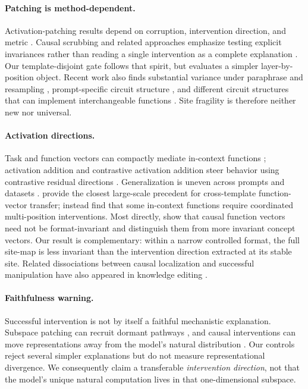 \documentclass[10pt]{article}
\begin{document}
\paragraph{Patching is method-dependent.}
Activation-patching results depend on corruption, intervention direction, and
metric \citep{heimersheim2024patching,zhang2024bestpractices}. Causal scrubbing
and related approaches emphasize testing explicit invariances rather than
reading a single intervention as a complete explanation
\citep{chan2022causal,long2025triangulation}. Our template-disjoint gate follows
that spirit, but evaluates a simpler layer-by-position object. Recent work also
finds substantial variance under paraphrase and resampling
\citep{meloux2025variance}, prompt-specific circuit structure
\citep{franco2026prompt}, and different circuit structures that can implement
interchangeable functions \citep{bayatmakou2026many}. Site fragility is
therefore neither new nor universal.

\paragraph{Activation directions.}
Task and function vectors can compactly mediate in-context functions
\citep{hendel2023task,todd2024function}; activation addition and contrastive
activation addition steer behavior using contrastive residual directions
\citep{turner2023steering,rimsky2024steering,zou2023representation}.
Generalization is uneven across prompts and datasets
\citep{tan2024generalisation,braun2025unreliability}. \citet{nadaf2026steerable}
provide the closest large-scale precedent for cross-template function-vector
transfer; \citet{cheng2026single} instead find that some in-context functions
require coordinated multi-position interventions. Most directly,
\citet{opielka2026invariance} show that causal function vectors need not be
format-invariant and distinguish them from more invariant concept vectors. Our
result is complementary: within a narrow controlled format, the full site-map
is less invariant than the intervention direction extracted at its stable site.
Related dissociations between causal localization and successful manipulation
have also appeared in knowledge editing \citep{hase2023localization}.

\paragraph{Faithfulness warning.}
Successful intervention is not by itself a faithful mechanistic explanation.
Subspace patching can recruit dormant pathways \citep{makelov2024illusion}, and
causal interventions can move representations away from the model's natural
distribution \citep{grant2026divergent}. Our controls reject several simpler
explanations but do not measure representational divergence. We consequently
claim a transferable \emph{intervention direction}, not that the model's unique
natural computation lives in that one-dimensional subspace.
\end{document}
